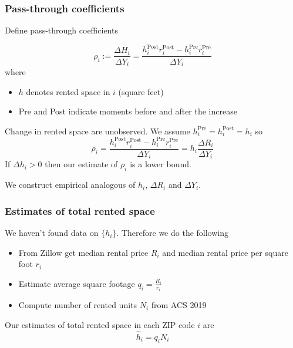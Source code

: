\documentclass[aspectratio=169, t]{beamer}
\begin{document}
\begin{frame}
	\frametitle{Pass-through coefficients}
	Define pass-through coefficients
	
	\begin{equation*}
		\rho_i := \frac{\Delta H_i}{\Delta Y_i} =  \frac{h^{\text{Post}}_i r^{\text{Post}}_i - h^{\text{Pre}}_i r^{\text{Pre}}_i}{\Delta Y_i}
	\end{equation*}
	where 
	\begin{itemize}
		\item $h$ denotes rented space in $i$ (square feet)
		\item Pre and Post indicate moments before and after the increase
	\end{itemize}

	\pause
	\vspace{3mm}
	Change in rented space are unobserved. We assume $h^{\text{Pre}}_i = h^{\text{Post}}_i = h_i$ so
	\begin{equation*}
		\rho_i = \frac{h^{\text{Post}}_i r^{\text{Post}}_i - h^{\text{Pre}}_i r^{\text{Pre}}_i}{\Delta Y_i} = h_i \frac{\Delta R_i}{\Delta Y_i}
	\end{equation*}
	If $\Delta h_i > 0$ then our estimate of $\rho_i$ is a lower bound.

	\pause
	\vspace{2mm}
	We construct empirical analogous of $h_i$, $\Delta R_i$ and $\Delta Y_i$.

\end{frame}

\begin{frame}
    \frametitle{Estimates of total rented space}
       
    We haven't found data on $\{h_i\}$. Therefore we do the following
    
    \begin{itemize}
    	\vspace{1mm}
        \item From Zillow get median rental price $R_i$ and median rental price per square foot $r_i$
        \vspace{1mm}
        \item Estimate average square footage $q_i = \frac{R_i}{r_i}$
        \vspace{1mm}
        \item Compute number of rented units $N_i$ from ACS 2019
    \end{itemize}
    
    \pause
    \vspace{3mm}
    Our estimates of total rented space in each ZIP code $i$ are
    \[
    \hat h_i = q_i N_i
    \]
\end{frame}
\end{document}

